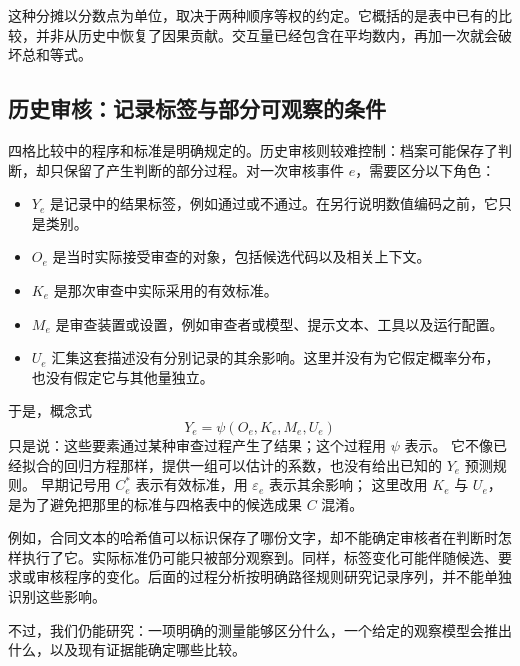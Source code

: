 这种分摊以分数点为单位，取决于两种顺序等权的约定。它概括的是表中已有的比较，并非从历史中恢复了因果贡献。交互量已经包含在平均数内，再加一次就会破坏总和等式。

\subsection{历史审核：记录标签与部分可观察的条件}
\label{subsec:historical-model}

四格比较中的程序和标准是明确规定的。历史审核则较难控制：档案可能保存了判断，却只保留了产生判断的部分过程。对一次审核事件 $e$，需要区分以下角色：
\begin{itemize}
\item $Y_e$ 是记录中的结果标签，例如通过或不通过。在另行说明数值编码之前，它只是类别。
\item $O_e$ 是当时实际接受审查的对象，包括候选代码以及相关上下文。
\item $K_e$ 是那次审查中实际采用的有效标准。
\item $M_e$ 是审查装置或设置，例如审查者或模型、提示文本、工具以及运行配置。
\item $U_e$ 汇集这套描述没有分别记录的其余影响。这里并没有为它假定概率分布，也没有假定它与其他量独立。
\end{itemize}
于是，概念式
\[
Y_e=\psi(O_e,K_e,M_e,U_e)
\]
只是说：这些要素通过某种审查过程产生了结果；这个过程用 $\psi$ 表示。
它不像已经拟合的回归方程那样，提供一组可以估计的系数，也没有给出已知的 $Y_e$ 预测规则。
早期记号用 $C_e^*$ 表示有效标准，用 $\varepsilon_e$ 表示其余影响；
这里改用 $K_e$ 与 $U_e$，是为了避免把那里的标准与四格表中的候选成果 $C$ 混淆。

例如，合同文本的哈希值可以标识保存了哪份文字，却不能确定审核者在判断时怎样执行了它。实际标准仍可能只被部分观察到。同样，标签变化可能伴随候选、要求或审核程序的变化。后面的过程分析按明确路径规则研究记录序列，并不能单独识别这些影响。

不过，我们仍能研究：一项明确的测量能够区分什么，一个给定的观察模型会推出什么，以及现有证据能确定哪些比较。